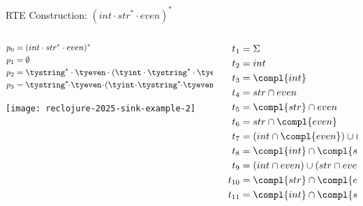 \begin{frame}{RTE Construction: $(int \cdot str^{*} \cdot even)^{*}$}
  \begin{columns}
    \begin{column}{0.5\textwidth}
      \begin{align*}
        p_0 &= (int \cdot str^{*} \cdot even)^{*}\\
        p_1 &= \emptyset\\
        p_2 &= \tystring^{*} \cdot \tyeven \cdot (\tyint \cdot \tystring^{*} \cdot \tyeven)^{*}\\
        p_3 &= \tystring^{*}\!\!\cdot\! \tyeven\!\cdot\! (\tyint\! \cdot\! \tystring^{*}\!\!\cdot\! \tyeven)^{*}\! \reor (\tyint\! \cdot\! \tystring^{*}\!\!\cdot\!\! \tyeven)^{*}
      \end{align*}



      \texttt{[image: reclojure-2025-sink-example-2]}
    \end{column}
    \begin{column}{0.5\textwidth}
      \begin{align*}
        t_1 &= \Sigma\\
        t_2 &= int  \\
        t_3 &= \compl{int}\\
        t_4 &= str \cap even\\
        t_5 &= \compl{str} \cap even\\
        t_6 &= str \cap \compl{even}\\
        t_7 &= (int \cap \compl{even}) \cup (str \cap \compl{even})\\
        t_8   &=\compl{int} \cap \compl{str} \cap even\\
        t_9 &=(int \cap even) \cup (str \cap even)\\
        t_{10} &=\compl{str} \cap \compl{even}\\
        t_{11} &=\compl{int} \cap \compl{str} \cap \compl{even}
      \end{align*}
    \end{column}
  \end{columns}
\end{frame}

